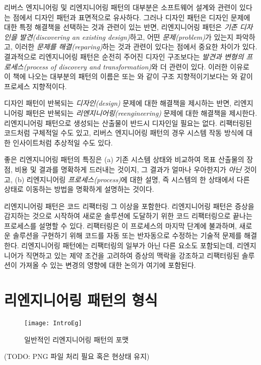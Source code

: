 \documentclass[a4paper,10pt,twoside]{book}
\begin{document}
리버스 엔지니어링 및 리엔지니어링 패턴의 대부분은 소프트웨어 설계와 관련이 있다는 점에서 디자인 패턴과 표면적으로 유사하다. 그러나 디자인 패턴은 디자인 문제에 대한 특정 해결책을 선택하는 것과 관련이 있는 반면, 리엔지니어링 패턴은 \emph{기존 디자인을 발견(discovering an existing design)}하고, 어떤 \emph{문제(problem)}가 있는지 파악하고, 이러한 \emph{문제를 해결(reparing)}하는 것과 관련이 있다는 점에서 중요한 차이가 있다. 결과적으로 리엔지니어링 패턴은 순전히 주어진 디자인 구조보다는 \emph{발견과 변형의 프로세스(process of discovery and transformation)}와 더 관련이 있다. 이러한 이유로 이 책에 나오는 대부분의 패턴의 이름은  또는 와 같이 구조 지향적이기보다는 와 같이 프로세스 지향적이다. 

디자인 패턴이 반복되는 \emph{디자인(design)} 문제에 대한 해결책을 제시하는 반면, 리엔지니어링 패턴은 반복되는 \emph{리엔지니어링(reengineering)} 문제에 대한 해결책을 제시한다. 리엔지니어링 패턴으로 생성되는 산출물이 반드시 디자인일 필요는 없다. 리팩터링된 코드처럼 구체적일 수도 있고, 리버스 엔지니어링 패턴의 경우 시스템 작동 방식에 대한 인사이트처럼 추상적일 수도 있다.

좋은 리엔지니어링 패턴의 특징은 (a) 기존 시스템 상태와 비교하여 목표 산출물의 장점, 비용 및 결과를 명확하게 드러내는 것이지, 그 결과가 얼마나 우아한지가 \emph{아닌} 것이고, (b) 리엔지니어링 \emph{프로세스(process)}에 대한 설명, 즉 시스템의 한 상태에서 다른 상태로 이동하는 방법을 명확하게 설명하는 것이다.

리엔지니어링 패턴은 코드 리팩터링 그 이상을 포함한다. 리엔지니어링 패턴은 증상을 감지하는 것으로 시작하여 새로운 솔루션에 도달하기 위한 코드 리팩터링으로 끝나는 프로세스를 설명할 수 있다. 리팩터링은 이 프로세스의 마지막 단계에 불과하며, 새로운 솔루션을 구현하기 위해 코드를 자동 또는 반자동으로 수정하는 기술적 문제를 해결한다. 리엔지니어링 패턴에는 리팩터링의 일부가 아닌 다른 요소도 포함되는데, 리엔지니어가 직면하고 있는 제약 조건을 고려하여 증상의 맥락을 강조하고 리팩터링된 솔루션이 가져올 수 있는 변경의 영향에 대한 논의가 여기에 포함된다. 
\section{리엔지니어링 패턴의 형식}

\begin{figure}
\begin{center}
\texttt{[image: IntroEg]}
\caption{일반적인 리엔지니어링 패턴의 포맷}
\end{center}
\end{figure}
(TODO: PNG 파일 처리 필요 혹은 현상태 유지)
\end{document}
